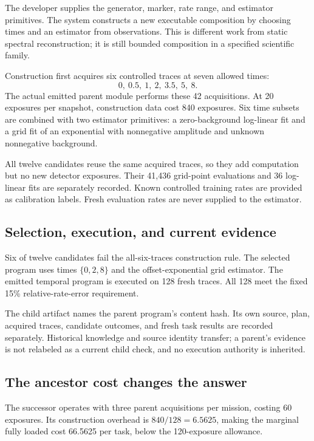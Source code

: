 \documentclass[11pt,a4paper]{article}
\begin{document}
The developer supplies the generator, marker, rate range, and estimator primitives. The system constructs a new executable composition by choosing times and an estimator from observations. This is different work from static spectral reconstruction; it is still bounded composition in a specified scientific family.

Construction first acquires six controlled traces at seven allowed times:
\[
0,\ 0.5,\ 1,\ 2,\ 3.5,\ 5,\ 8.
\]
The actual emitted parent module performs these 42 acquisitions. At 20 exposures per snapshot, construction data cost 840 exposures. Six time subsets are combined with two estimator primitives: a zero-background log-linear fit and a grid fit of an exponential with nonnegative amplitude and unknown nonnegative background.

All twelve candidates reuse the same acquired traces, so they add computation but no new detector exposures. Their 41,436 grid-point evaluations and 36 log-linear fits are separately recorded. Known controlled training rates are provided as calibration labels. Fresh evaluation rates are never supplied to the estimator.

\subsection{Selection, execution, and current evidence}

Six of twelve candidates fail the all-six-traces construction rule. The selected program uses times \(\{0,2,8\}\) and the offset-exponential grid estimator. The emitted temporal program is executed on 128 fresh traces. All 128 meet the fixed 15\% relative-rate-error requirement.

The child artifact names the parent program's content hash. Its own source, plan, acquired traces, candidate outcomes, and fresh task results are recorded separately. Historical knowledge and source identity transfer; a parent's evidence is not relabeled as a current child check, and no execution authority is inherited.

\subsection{The ancestor cost changes the answer}

The successor operates with three parent acquisitions per mission, costing 60 exposures. Its construction overhead is \(840/128=6.5625\), making the marginal fully loaded cost 66.5625 per task, below the 120-exposure allowance.
\end{document}
